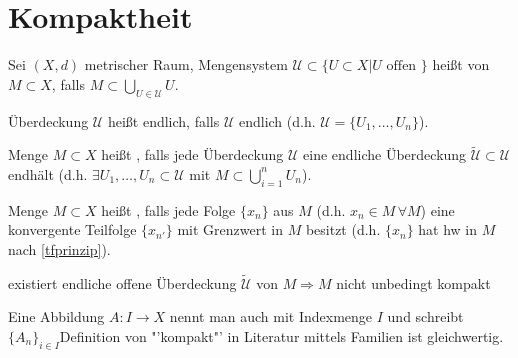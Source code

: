 \section{Kompaktheit}
\begin{*definition}
Sei $(X,d)$ metrischer Raum, Mengensystem $\mathcal{U}\subset \{ U\subset X | U \text{ offen }\}$ heißt  von $M\subset X$, falls $M\subset \bigcup_{U\in\mathcal{U}} U$.

Überdeckung $\mathcal{U}$ heißt endlich, falls $\mathcal{U}$ endlich (d.h. $\mathcal{U} = \{U_1,\dotsc,U_n\}$).

Menge $M\subset X$ heißt , falls jede Überdeckung $\mathcal{U}$ eine endliche Überdeckung $\tilde{\mathcal{U}}\subset \mathcal{U}$ endhält (d.h. $\exists U_1,\dotsc, U_n\subset\mathcal{U}$ mit $M\subset\bigcup_{i=1}^n U_n$).

Menge $M\subset X$ heißt , falls jede Folge $\{x_n\}$ aus $M$ (d.h. $x_n\in M\,\forall M$) eine konvergente Teilfolge $\{x_{n'}\}$ mit Grenzwert in $M$ besitzt (d.h. $\{x_n\}$ hat \gls{hw} in $M$ nach \ref{tfprinzip}).
\end{*definition}

\begin{boldenvironment}[Warnung]
	existiert endliche offene Überdeckung $\tilde{\mathcal{U}}$ von $M\Rightarrow M$ nicht unbedingt kompakt
\end{boldenvironment}

\begin{underlinedenvironment}[Hinweis]
	Eine Abbildung $A:I\to X$ nennt man auch  mit Indexmenge $I$ und schreibt $\{A_n\}_{i\in I}$Definition von "'kompakt"' in Literatur mittels Familien ist gleichwertig.
\end{underlinedenvironment}

